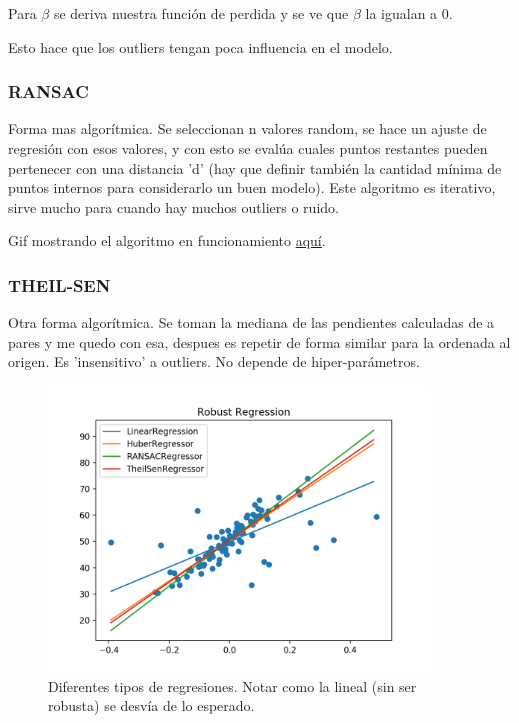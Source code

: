 \documentclass[titlepage,a4paper]{article}
\begin{document}
Para $\beta$ se deriva nuestra función de perdida y se ve que $\beta$ la igualan a 0.

Esto hace que los outliers tengan poca influencia en el modelo.


\subsubsection{RANSAC}
Forma mas algorítmica. Se seleccionan n valores random, se hace un ajuste de regresión con esos valores, y con esto se evalúa cuales puntos restantes pueden pertenecer con una distancia 'd' (hay que definir también la cantidad mínima de puntos internos para considerarlo un buen modelo). Este algoritmo es iterativo, sirve mucho para cuando hay muchos outliers o ruido.

Gif mostrando el algoritmo en funcionamiento \href{https://upload.wikimedia.org/wikipedia/commons/c/c0/RANSAC_LINIE_Animiert.gif}{aquí}.

\subsubsection{THEIL-SEN}
Otra forma algorítmica. Se toman la mediana de las pendientes calculadas de a pares y me quedo con esa, despues es repetir de forma similar para la ordenada al origen. Es 'insensitivo' a outliers. No depende de hiper-parámetros.

\begin{figure}[!htb]
    \centering
    \includegraphics[width=0.9\textwidth]{imagenesResumen/ComparacionRegresiones.png}
    \caption{Diferentes tipos de regresiones. Notar como la lineal (sin ser robusta) se desvía de lo esperado.}
\end{figure}
\end{document}
